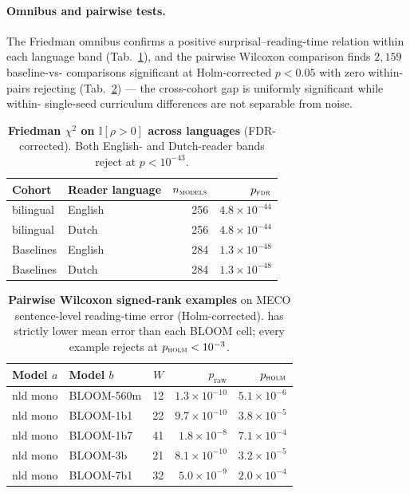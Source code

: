 \paragraph{Omnibus and pairwise tests.} The Friedman omnibus confirms a positive surprisal--reading-time relation within each language band (Tab.~\ref{tab:sig_friedman}), and the pairwise Wilcoxon comparison finds $2{,}159$ baseline-vs-\beetle{} comparisons significant at Holm-corrected $p<0.05$ with zero within-\beetle{} pairs rejecting (Tab.~\ref{tab:sig_wilcoxon_examples}) --- the cross-cohort gap is uniformly significant while within-\beetle{} single-seed curriculum differences are not separable from noise.
 
\begin{table}[!ht]
  \centering \small
  \caption{\textbf{Friedman $\chi^2$ on $\mathbb{I}[\rho>0]$ across languages} (FDR-corrected). Both English- and Dutch-reader bands reject at $p<10^{-43}$.}
  \label{tab:sig_friedman}
  \begin{tabular}{llrr}
    \toprule
    Cohort & Reader language & $n_\textsc{models}$ & $p_\textsc{fdr}$ \\
    \midrule
    \beetle{} bilingual & English & 256 & $4.8{\times}10^{-44}$ \\
    \beetle{} bilingual & Dutch   & 256 & $4.8{\times}10^{-44}$ \\
    Baselines           & English & 284 & $1.3{\times}10^{-48}$ \\
    Baselines           & Dutch   & 284 & $1.3{\times}10^{-48}$ \\
    \bottomrule
  \end{tabular}
\end{table}
 
\begin{table}[!ht]
  \centering \small
  \caption{\textbf{Pairwise Wilcoxon signed-rank examples} on MECO sentence-level reading-time error (Holm-corrected). \beetle{} has strictly lower mean error than each BLOOM cell; every example rejects at $p_\textsc{holm}<10^{-3}$.}
  \label{tab:sig_wilcoxon_examples}
  \begin{tabular}{llrrr}
    \toprule
    Model $a$ & Model $b$ & $W$ & $p_\text{raw}$ & $p_\textsc{holm}$ \\
    \midrule
    \beetle{} nld mono & BLOOM-560m & 12 & $1.3{\times}10^{-10}$ & $5.1{\times}10^{-6}$ \\
    \beetle{} nld mono & BLOOM-1b1  & 22 & $9.7{\times}10^{-10}$ & $3.8{\times}10^{-5}$ \\
    \beetle{} nld mono & BLOOM-1b7  & 41 & $1.8{\times}10^{-8}$  & $7.1{\times}10^{-4}$ \\
    \beetle{} nld mono & BLOOM-3b   & 21 & $8.1{\times}10^{-10}$ & $3.2{\times}10^{-5}$ \\
    \beetle{} nld mono & BLOOM-7b1  & 32 & $5.0{\times}10^{-9}$  & $2.0{\times}10^{-4}$ \\
    \bottomrule
  \end{tabular}
\end{table}
 
